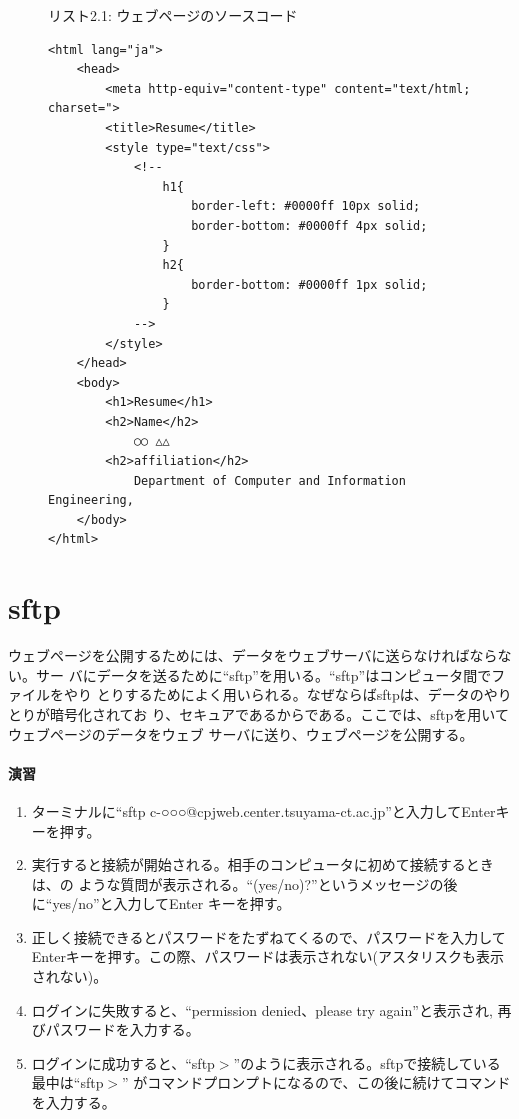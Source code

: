 \begin{figure}[htbp]
\begin{center}
{\small リスト2.1: ウェブページのソースコード}
{\small
\begin{verbatim}
<html lang="ja">
    <head>
        <meta http-equiv="content-type" content="text/html; charset=">
        <title>Resume</title>
        <style type="text/css">
            <!--
                h1{
                    border-left: #0000ff 10px solid;
                    border-bottom: #0000ff 4px solid;
                }
                h2{
                    border-bottom: #0000ff 1px solid;
                }
            -->
        </style>
    </head>
    <body>
        <h1>Resume</h1>
        <h2>Name</h2>
            ○○ △△
        <h2>affiliation</h2>
            Department of Computer and Information Engineering,
    </body>
</html>
\end{verbatim}
}
\end{center}
\end{figure}

\section{sftp}
ウェブページを公開するためには、データをウェブサーバに送らなければならない。サー
バにデータを送るために``sftp''を用いる。``sftp''はコンピュータ間でファイルをやり
とりするためによく用いられる。なぜならばsftpは、データのやりとりが暗号化されてお
り、セキュアであるからである。ここでは、sftpを用いてウェブページのデータをウェブ
サーバに送り、ウェブページを公開する。

\paragraph{演習}
\begin{enumerate}
\item ターミナルに``sftp c-○○○@cpjweb.center.tsuyama-ct.ac.jp''と入力してEnterキーを押す。
\item 実行すると接続が開始される。相手のコンピュータに初めて接続するときは、の
      ような質問が表示される。``(yes/no)?''というメッセージの後に``yes/no''と入力してEnter
      キーを押す。
\item 正しく接続できるとパスワードをたずねてくるので、パスワードを入力してEnterキーを押す。この際、パスワードは表示されない(アスタリスクも表示されない)。
\item ログインに失敗すると、``permission denied、please try again''と表示され,
      再びパスワードを入力する。
\item ログインに成功すると、``sftp$>$''のように表示される。sftpで接続している最中は``sftp$>$''
      がコマンドプロンプトになるので、この後に続けてコマンドを入力する。
\end{enumerate}

